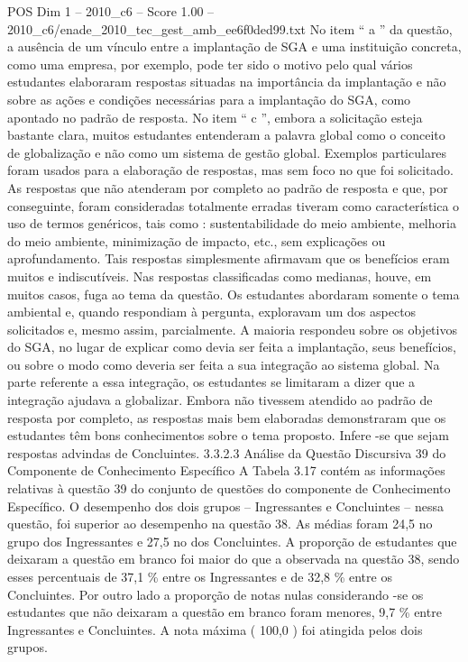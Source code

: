 \begin{textsample}{POS Dim 1 – 2010\_c6 – Score 1.00 – 2010\_c6/enade\_2010\_tec\_gest\_amb\_ee6f0ded99.txt}
No item “ a ” da questão, a ausência de um vínculo entre a implantação de SGA e uma instituição concreta, como uma empresa, por exemplo, pode ter sido o motivo pelo qual vários estudantes elaboraram respostas situadas na importância da implantação e não sobre as ações e condições necessárias para a implantação do SGA, como apontado no padrão de resposta.
No item “ c ”, embora a solicitação esteja bastante clara, muitos estudantes entenderam a palavra global como o conceito de globalização e não como um sistema de gestão global.
Exemplos particulares foram usados para a elaboração de respostas, mas sem foco no que foi solicitado.
As respostas que não atenderam por completo ao padrão de resposta e que, por conseguinte, foram consideradas totalmente erradas tiveram como característica o uso de termos genéricos, tais como : sustentabilidade do meio ambiente, melhoria do meio ambiente, minimização de impacto, etc., sem explicações ou aprofundamento.
Tais respostas simplesmente afirmavam que os benefícios eram muitos e indiscutíveis.
Nas respostas classificadas como medianas, houve, em muitos casos, fuga ao tema da questão.
Os estudantes abordaram somente o tema ambiental e, quando respondiam à pergunta, exploravam um dos aspectos solicitados e, mesmo assim, parcialmente.
A maioria respondeu sobre os objetivos do SGA, no lugar de explicar como devia ser feita a implantação, seus benefícios, ou sobre o modo como deveria ser feita a sua integração ao sistema global.
Na parte referente a essa integração, os estudantes se limitaram a dizer que a integração ajudava a globalizar.
Embora não tivessem atendido ao padrão de resposta por completo, as respostas mais bem elaboradas demonstraram que os estudantes têm bons conhecimentos sobre o tema proposto.
Infere -se que sejam respostas advindas de Concluintes. 3.3.2.3 Análise da Questão Discursiva 39 do Componente de Conhecimento Específico A Tabela 3.17 contém as informações relativas à questão 39 do conjunto de questões do componente de Conhecimento Específico.
O desempenho dos dois grupos – Ingressantes e Concluintes – nessa questão, foi superior ao desempenho na questão 38.
As médias foram 24,5 no grupo dos Ingressantes e 27,5 no dos Concluintes.
A proporção de estudantes que deixaram a questão em branco foi maior do que a observada na questão 38, sendo esses percentuais de 37,1 \% entre os Ingressantes e de 32,8 \% entre os Concluintes.
Por outro lado a proporção de notas nulas considerando -se os estudantes que não deixaram a questão em branco foram menores, 9,7 \% entre Ingressantes e Concluintes.
A nota máxima ( 100,0 ) foi atingida pelos dois grupos.

\end{textsample}
